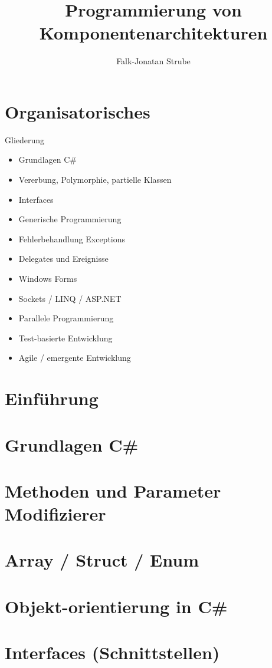\documentclass{scrreprt}
\title{Programmierung von Komponentenarchitekturen}
\author{Falk-Jonatan Strube}
\begin{document}
\maketitle
\tableofcontents

\chapter*{Organisatorisches}
Gliederung
\begin{itemize}
\item Grundlagen C\#
\item Vererbung, Polymorphie, partielle Klassen
\item Interfaces
\item Generische Programmierung
\item Fehlerbehandlung Exceptions
\item Delegates und Ereignisse
\item Windows Forms
\item Sockets / LINQ / ASP.NET
\item Parallele Programmierung
\item Test-basierte Entwicklung
\item Agile / emergente Entwicklung 
\end{itemize}

\chapter{Einführung}


\chapter{Grundlagen C\#}


\chapter{Methoden und Parameter Modifizierer}


\chapter{Array / Struct / Enum}

 
\chapter{Objekt-orientierung in C\#}


\chapter{Interfaces (Schnittstellen)}

\end{document}
